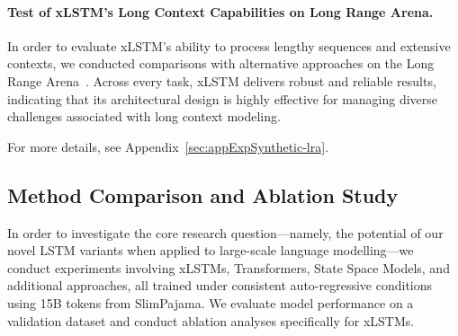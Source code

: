 \paragraph{Test of xLSTM's Long Context Capabilities on Long Range Arena.} In order to evaluate xLSTM’s ability to process lengthy sequences and extensive contexts, we conducted comparisons with alternative approaches on the Long Range Arena~\citep{Tay:21}. Across every task, xLSTM delivers robust and reliable results, indicating that its architectural design is highly effective for managing diverse challenges associated with long context modeling.

For more details, see Appendix~\ref{sec:appExpSynthetic-lra}.

\subsection{Method Comparison and Ablation Study}
\label{sec:ExpComparison}

In order to investigate the core research question—namely, the potential of our novel LSTM variants when applied to large-scale language modelling—we conduct experiments involving xLSTMs, Transformers, State Space Models, and additional approaches, all trained under consistent auto-regressive conditions using 15B tokens from SlimPajama. We evaluate model performance on a validation dataset and conduct ablation analyses specifically for xLSTMs.

